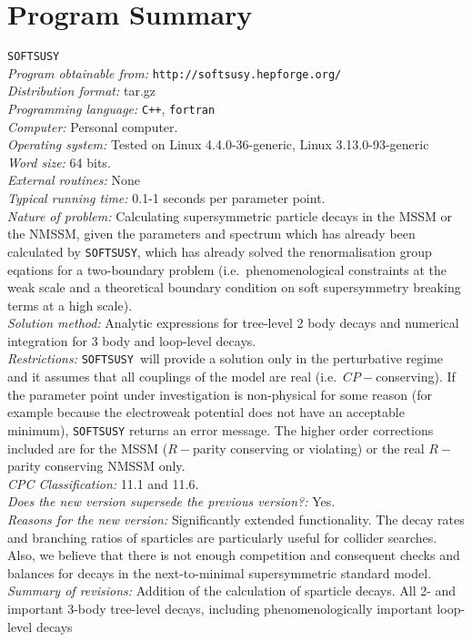 \documentclass[final,3p,times,pdflatex]{elsarticle}
\def\SOFTSUSY{{\tt SOFTSUSY}}
\begin{document}
\section{Program Summary}
 \SOFTSUSY{} \\
{\em Program obtainable   from:} {\tt http://softsusy.hepforge.org/} \\
{\em Distribution format:}\/ tar.gz \\
{\em Programming language:} {\tt C++}, {\tt fortran} \\
{\em Computer:}\/ Personal computer. \\
{\em Operating system:}\/ Tested on Linux 4.4.0-36-generic, Linux 3.13.0-93-generic
\\
{\em Word size:}\/ 64 bits. \\
{\em External routines:}\/ None \\
{\em Typical running time:}\/ 0.1-1 seconds per parameter point. \\
{\em Nature of problem:}\/ Calculating supersymmetric particle decays in the
MSSM or the NMSSM\@, given the parameters and spectrum which has already been
calculated by \SOFTSUSY{}, which has already solved the renormalisation group
eqations for a two-boundary problem (i.e.\ phenomenological constraints at the
weak 
scale and a theoretical boundary condition on soft supersymmetry breaking
terms at a high scale). \\
{\em Solution method:}\/ Analytic expressions for tree-level 2 body decays and
numerical integration for 3 body and loop-level decays.\\
{\em Restrictions:} \SOFTSUSY~will provide a solution only in the
perturbative regime and it
assumes that all couplings of the model are real
(i.e.\ $CP-$conserving). If the parameter point under investigation is
non-physical for some reason (for example because the electroweak potential
does not have an acceptable minimum), \SOFTSUSY{} returns an error message.
The higher order corrections included are for the 
MSSM ($R-$parity conserving or violating) or the real $R-$parity conserving
NMSSM only. \\
{\em CPC Classification:}\/ 11.1 and 11.6. \\
{\em Does the new version supersede the previous version?:}\/ Yes. \\
{\em Reasons for the new version:}\/ Significantly extended functionality. The
decay rates and branching ratios of sparticles are particularly useful for
collider searches. Also, we believe that there is not enough competition and
consequent checks and balances for decays in the next-to-minimal
supersymmetric standard model.\\
{\em Summary of revisions:}\/
Addition of the calculation of sparticle decays. 
All 2- and important 3-body tree-level
decays, including phenomenologically important loop-level decays
\end{document}
